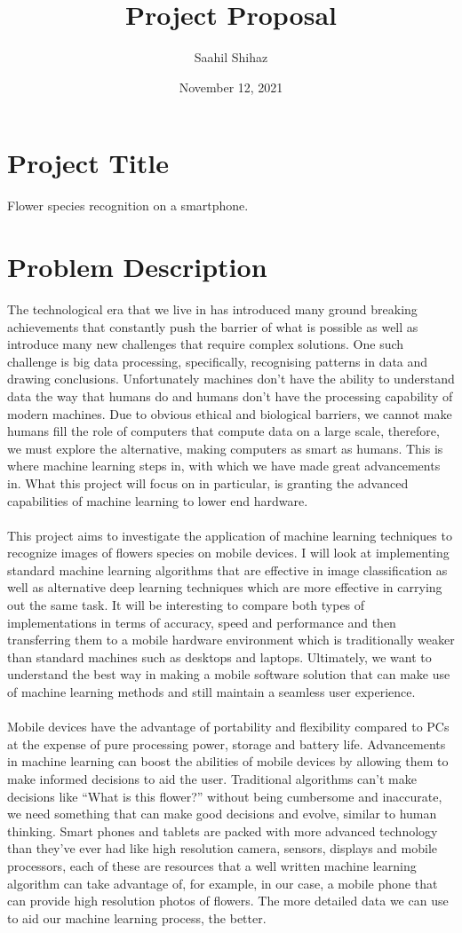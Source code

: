 \documentclass{article}
\title{Project Proposal}
\author{Saahil Shihaz}
\date{November 12, 2021}
\begin{document}
\maketitle
\newpage
\section{Project Title}
Flower species recognition on a smartphone.
\section{Problem Description}
The technological era that we live in has introduced many ground breaking achievements that constantly push the barrier of what is possible as well as introduce many new challenges that require complex solutions. One such challenge is big data processing, specifically, recognising patterns in data and drawing conclusions. Unfortunately machines don’t have the ability to understand data the way that humans do and humans don’t have the processing capability of modern machines. Due to obvious ethical and biological barriers, we cannot make humans fill the role of computers that compute data on a large scale, therefore, we must explore the alternative, making computers as smart as humans. This is where machine learning steps in, with which we have made great advancements in. What this project will focus on in particular, is granting the advanced capabilities of machine learning to lower end hardware.
\\
\\
This project aims to investigate the application of machine learning techniques to recognize images of flowers species on mobile devices. I will look at implementing standard machine learning algorithms that are effective in image classification as well as alternative deep learning techniques which are more effective in carrying out the same task. It will be interesting to compare both types of implementations in terms of accuracy, speed and performance and then transferring them to a mobile hardware environment which is traditionally weaker than standard machines such as desktops and laptops. Ultimately, we want to understand the best way in making a mobile software solution that can make use of machine learning methods and still maintain a seamless user experience.
\\
\\
Mobile devices have the advantage of portability and flexibility compared to PCs at the expense of pure processing power, storage and battery life. Advancements in machine learning can boost the abilities of mobile devices by allowing them to make informed decisions to aid the user. Traditional algorithms can’t make decisions like “What is this flower?” without being cumbersome and inaccurate, we need something that can make good decisions and evolve, similar to human thinking. Smart phones and tablets are packed with more advanced technology than they’ve ever had like high resolution camera, sensors, displays and mobile processors, each of these are resources that a well written machine learning algorithm can take advantage of, for example, in our case, a mobile phone that can provide high resolution photos of flowers. The more detailed data we can use to aid our machine learning process, the better. 
\end{document}

